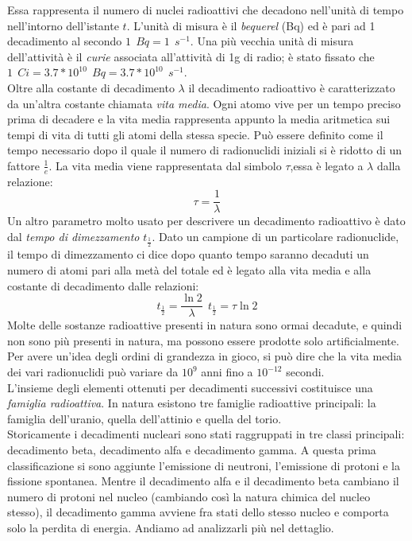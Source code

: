 \documentclass[12pt, letterpaper]{book}
\begin{document}
Essa rappresenta il numero di nuclei radioattivi che decadono nell'unità di tempo nell'intorno dell'istante $t$. L'unità di misura è il \textit{bequerel} (Bq) ed è pari ad 1 decadimento al secondo $1~~ Bq=1~~s^{-1}$. Una più vecchia unità di misura dell'attività è il \textit{curie} associata all'attività di 1g di radio; è stato fissato che $1~~Ci=3.7*10^{10}~~Bq=3.7*10^{10}~~s^{-1}$.\\
Oltre alla costante di decadimento $\lambda$ il decadimento radioattivo è caratterizzato da un'altra costante chiamata \textit{vita media}. Ogni atomo vive per un tempo preciso prima di decadere e la vita media rappresenta appunto la media aritmetica sui tempi di vita di tutti gli atomi della stessa specie. Può essere definito come il tempo necessario dopo il quale il numero di radionuclidi iniziali si è ridotto di un fattore $\frac{1}{e}$. La vita media viene rappresentata dal simbolo $\tau$,essa è legato a $\lambda$ dalla relazione:
$$\tau=\frac{1}{\lambda} $$
Un altro parametro molto usato per descrivere un decadimento radioattivo è dato dal \textit{tempo di dimezzamento} $t_\frac{1}{2}$. Dato un campione di un particolare radionuclide, il tempo di dimezzamento ci dice dopo quanto tempo saranno decaduti un numero di atomi pari alla metà del totale ed è legato alla vita media e alla costante di decadimento dalle relazioni:
$$t_\frac{1}{2}=\frac{\ln{2}}{\lambda} ~~ t_{\frac{1}{2}}=\tau\ln 2$$
Molte delle sostanze radioattive presenti in natura sono ormai decadute, e quindi non sono più presenti in natura, ma possono essere prodotte solo artificialmente. Per avere un'idea degli ordini di grandezza in gioco, si può dire che la vita media dei vari radionuclidi può variare da $10^9$ anni fino a $10^{-12}$ secondi.\\
L'insieme degli elementi ottenuti per decadimenti successivi costituisce una \textit{famiglia radioattiva}. In natura esistono tre famiglie radioattive principali: la famiglia dell'uranio, quella dell'attinio e quella del torio.\\
Storicamente i decadimenti nucleari sono stati raggruppati in tre classi principali: decadimento beta, decadimento alfa e decadimento gamma. A questa prima classificazione si sono aggiunte l'emissione di neutroni, l'emissione di protoni e la fissione spontanea. Mentre il decadimento alfa e il decadimento beta cambiano il numero di protoni nel nucleo (cambiando così la natura chimica del nucleo stesso), il decadimento gamma avviene fra stati dello stesso nucleo e comporta solo la perdita di energia. Andiamo ad analizzarli più nel dettaglio.
\end{document}

